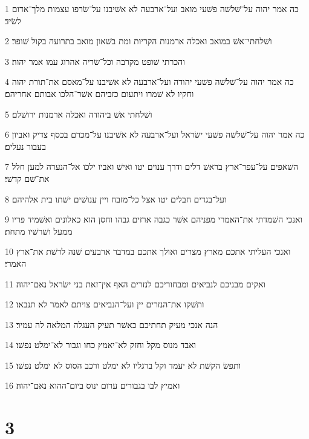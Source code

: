 \par 1 כה אמר יהוה על־שׁלשׁה פשׁעי מואב ועל־ארבעה לא אשׁיבנו על־שׂרפו עצמות מלך־אדום לשׂיד׃
\par 2 ושׁלחתי־אשׁ במואב ואכלה ארמנות הקריות ומת בשׁאון מואב בתרועה בקול שׁופר׃
\par 3 והכרתי שׁופט מקרבה וכל־שׂריה אהרוג עמו אמר יהוה׃
\par 4 כה אמר יהוה על־שׁלשׁה פשׁעי יהודה ועל־ארבעה לא אשׁיבנו על־מאסם את־תורת יהוה וחקיו לא שׁמרו ויתעום כזביהם אשׁר־הלכו אבותם אחריהם׃
\par 5 ושׁלחתי אשׁ ביהודה ואכלה ארמנות ירושׁלם׃
\par 6 כה אמר יהוה על־שׁלשׁה פשׁעי ישׂראל ועל־ארבעה לא אשׁיבנו על־מכרם בכסף צדיק ואביון בעבור נעלים׃
\par 7 השׁאפים על־עפר־ארץ בראשׁ דלים ודרך ענוים יטו ואישׁ ואביו ילכו אל־הנערה למען חלל את־שׁם קדשׁי׃
\par 8 ועל־בגדים חבלים יטו אצל כל־מזבח ויין ענושׁים ישׁתו בית אלהיהם׃
\par 9 ואנכי השׁמדתי את־האמרי מפניהם אשׁר כגבה ארזים גבהו וחסן הוא כאלונים ואשׁמיד פריו ממעל ושׁרשׁיו מתחת׃
\par 10 ואנכי העליתי אתכם מארץ מצרים ואולך אתכם במדבר ארבעים שׁנה לרשׁת את־ארץ האמרי׃
\par 11 ואקים מבניכם לנביאים ומבחוריכם לנזרים האף אין־זאת בני ישׂראל נאם־יהוה׃
\par 12 ותשׁקו את־הנזרים יין ועל־הנביאים צויתם לאמר לא תנבאו׃
\par 13 הנה אנכי מעיק תחתיכם כאשׁר תעיק העגלה המלאה לה עמיר׃
\par 14 ואבד מנוס מקל וחזק לא־יאמץ כחו וגבור לא־ימלט נפשׁו׃
\par 15 ותפשׂ הקשׁת לא יעמד וקל ברגליו לא ימלט ורכב הסוס לא ימלט נפשׁו׃
\par 16 ואמיץ לבו בגבורים ערום ינוס ביום־ההוא נאם־יהוה׃

\chapter{3}

